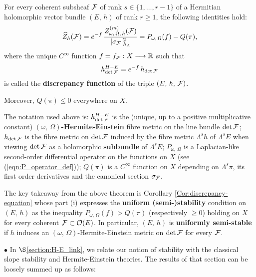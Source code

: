 \documentclass[12pt]{article}
\begin{document}
\begin{The}\label{The:introd_discrepancy-equation} For every coherent subsheaf ${\cal F}$ of rank $s\in\{1,\dots , r-1\}$ of a Hermitian holomorphic vector bundle $(E,\,h)$ of rank $r\geq 1$, the following identities hold: \begin{eqnarray*}\widehat{Z}_h({\cal F}) = e^{-f}\,\frac{Z_{\omega,\,\Omega,\,h}^{(m)}({\cal F})}{|\sigma_{{\cal F}}|^2_{h_A}} = P_{\omega,\,\Omega}(f) - Q(\pi),\end{eqnarray*} where the unique $C^\infty$ function $f = f_{\cal F}:X\longrightarrow\mathbb{R}$ such that \begin{eqnarray*}h_{\det{\cal F}}^{H-E} = e^{-f}\,h_{\det{\cal F}}\end{eqnarray*} is called the {\bf discrepancy function} of the triple $(E,\,h,\,{\cal F})$.

  Moreover, $Q(\pi)\leq 0$ everywhere on $X$. 

\end{The}  

  The notation used above is: $h_{\det{\cal F}}^{H-E}$ is the (unique, up to a positive multiplicative constant) {\bf $(\omega,\,\Omega)$-Hermite-Einstein} fibre metric on the line bundle $\det{\cal F}$; $h_{\det{\cal F}}$ is the fibre metric on $\det{\cal F}$ induced by the fibre metric $\Lambda^sh$ of $\Lambda^sE$ when viewing $\det{\cal F}$ as a holomorphic {\bf subbundle} of $\Lambda^sE$; $P_{\omega,\,\Omega}$ is a Laplacian-like second-order differential operator on the functions on $X$ (see (\ref{eqn:P_operator_def})); $Q(\pi)$ is a $C^\infty$ function on $X$ depending on $\Lambda^s\pi$, its first order derivatives and the canonical section $\sigma_{\cal F}$.   

The key takeaway from the above theorem is Corollary \ref{Cor:discrepancy-equation} whose part (i) expresses the {\bf uniform (semi-)stability} condition on $(E,\,h)$ as the inequality $P_{\omega,\,\Omega}(f) > Q(\pi)$ (respectively $\geq 0$) holding on $X$ for every coherent ${\cal F}\subset{\cal O}(E)$. In particular, $(E,\,h)$ is {\bf uniformly semi-stable} if $h$ induces an $(\omega,\,\Omega)$-Hermite-Einstein metric on $\det {\cal F}$ for every ${\cal F}$. 

\vspace{1ex}

$\bullet$ In $\S$\ref{section:H-E_link}, we relate our notion of stability with the classical slope stability and Hermite-Einstein theories. The results of that section can be loosely summed up as follows:
\end{document}
